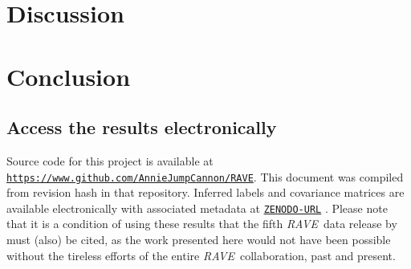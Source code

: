 \documentclass[preprint,trackchanges]{aastex}
\newcommand{\project}[1]{\textsl{#1}}
\newcommand{\rave}{\project{\acronym{RAVE}}}
\newcommand{\acronym}[1]{{\small{#1}}}
\newcommand{\teff}{T_{\mathrm{eff}}}
\newcommand{\logg}{\log g}
\newcommand{\Nstars}{483,330}
\begin{document}



\section{Discussion}
\label{sec:discussion}





\section{Conclusion}
\label{sec:conclusion}



\subsection*{Access the results electronically}

Source code for this project is available at \texttt{\url{https://www.github.com/AnnieJumpCannon/RAVE}}.  
This document was compiled from revision hash \texttt{\githash} in that repository.
Inferred labels and covariance matrices are available electronically with 
associated metadata at \texttt{\url{ZENODO-URL}} \citep{DATA_REPOSITORY}.  
Please note that it is a condition of using these results that the fifth \rave\ 
data release by \citet{Kunder_2016} must (also) be cited, as the work presented 
here would not have been possible without the tireless efforts of the entire 
\rave\ collaboration, past and present.
\end{document}
